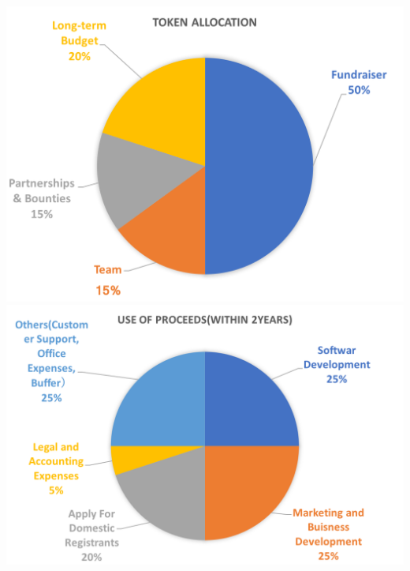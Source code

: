 \documentclass{jsarticle}
\begin{document}
	\includegraphics[scale=0.4]{img/tokenallocation.png}
	\includegraphics[scale=0.4]{img/useofproceeds.png}
\end{document}
